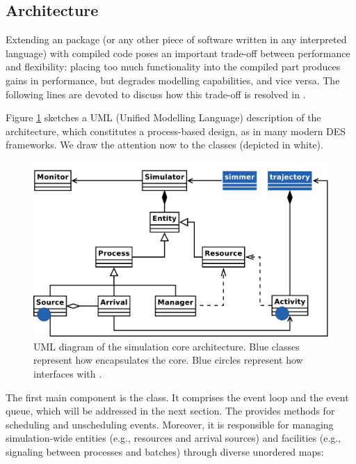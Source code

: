 \documentclass[
  nojss]{jss}
\begin{document}
\hypertarget{architecture}{%
\subsection{Architecture}\label{architecture}}

Extending an  package (or any other piece of software
written in any interpreted language) with compiled code poses an
important trade-off between performance and flexibility: placing too
much functionality into the compiled part produces gains in performance,
but degrades modelling capabilities, and vice versa. The following lines
are devoted to discuss how this trade-off is resolved in .

Figure \ref{architecture} sketches a UML (Unified Modelling Language)
description of the architecture, which constitutes a process-based
design, as in many modern DES frameworks. We draw the attention now to
the  classes (depicted in white).

\begin{figure}
\centering
\includegraphics{includes/jss-simmer-design.pdf}
\caption{UML diagram of the simulation core architecture. Blue classes
represent how  encapsulates the  core. Blue
circles represent how  interfaces with
.\label{architecture}}
\end{figure}

The first main component is the  class. It comprises the
event loop and the event queue, which will be addressed in the next
section. The  provides methods for scheduling and
unscheduling events. Moreover, it is responsible for managing
simulation-wide entities (e.g., resources and arrival sources) and
facilities (e.g., signaling between processes and batches) through
diverse  unordered maps:
\end{document}

